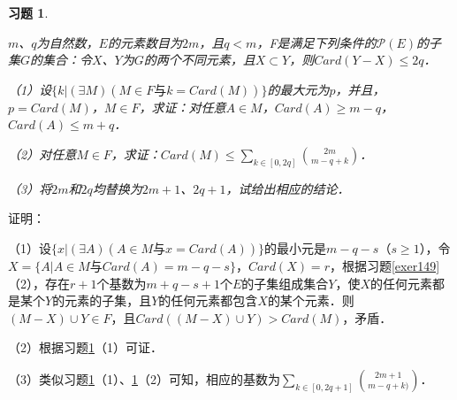 \documentclass[12pt, a4paper, oneside]{book}
\newtheorem{exer}{习题}
\begin{document}
			\begin{exer}\label{exer150}
				\hfill\par
				$m$、$q$为自然数，$E$的元素数目为$2m$，且$q<m$，F是满足下列条件的$\mathcal{P}(E)$的子集$G$的集合：令$X$、$Y$为$G$的两个不同元素，且$X\subset Y$，则$Card(Y-X)\leq 2q$．
				\par
				（1）设$\{k|(\exists M)(M\in F\text{与}k=Card(M))\}$的最大元为$p$，并且，$p=Card(M)$，$M\in F$，求证：对任意$A\in M$，$Card(A)\geq m-q$，$Card(A)\leq m+q$．
				\par
				（2）对任意$M\in F$，求证：$Card(M)\leq \sum\limits_{k\in [0, 2q]}\binom{2m}{m-q+k}$．
				\par
				（3）将$2m$和$2q$均替换为$2m+1$、$2q+1$，试给出相应的结论．
			\end{exer}
			证明：
			\par
			（1）设$\{x|(\exists A)(A\in M\text{与}x=Card(A))\}$的最小元是$m-q-s$（$s\geq 1$），令$X=\{A|A\in M\text{与}Card(A)=m-q-s\}$，$Card(X)=r$，根据习题\ref{exer149}（2），存在$r+1$个基数为$m+q-s+1$个$E$的子集组成集合$Y$，使$X$的任何元素都是某个$Y$的元素的子集，且$Y$的任何元素都包含$X$的某个元素．则$(M-X)\cup Y \in F$，且$Card((M-X)\cup Y)>Card(M)$，矛盾．
			\par
			（2）根据习题\ref{exer150}（1）可证．
			\par
			（3）类似习题\ref{exer150}（1）、\ref{exer150}（2）可知，相应的基数为$\sum\limits_{k\in [0, 2q+1]}\binom{2m+1}{m-q+k)}$．
			
\end{document}
